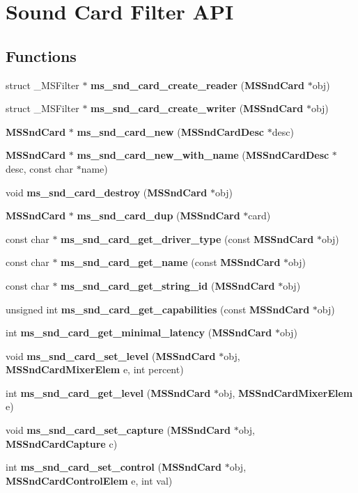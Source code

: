 \section{Sound Card Filter API}
\label{group__mediastreamer2__soundcardfilter}
\subsection*{Functions}
\begin{DoxyCompactItemize}
\item 
struct \_\-MSFilter $\ast$ {\bf ms\_\-snd\_\-card\_\-create\_\-reader} ({\bf MSSndCard} $\ast$obj)
\item 
struct \_\-MSFilter $\ast$ {\bf ms\_\-snd\_\-card\_\-create\_\-writer} ({\bf MSSndCard} $\ast$obj)
\item 
{\bf MSSndCard} $\ast$ {\bf ms\_\-snd\_\-card\_\-new} ({\bf MSSndCardDesc} $\ast$desc)
\item 
{\bf MSSndCard} $\ast$ {\bf ms\_\-snd\_\-card\_\-new\_\-with\_\-name} ({\bf MSSndCardDesc} $\ast$desc, const char $\ast$name)
\item 
void {\bf ms\_\-snd\_\-card\_\-destroy} ({\bf MSSndCard} $\ast$obj)
\item 
{\bf MSSndCard} $\ast$ {\bf ms\_\-snd\_\-card\_\-dup} ({\bf MSSndCard} $\ast$card)
\item 
const char $\ast$ {\bf ms\_\-snd\_\-card\_\-get\_\-driver\_\-type} (const {\bf MSSndCard} $\ast$obj)
\item 
const char $\ast$ {\bf ms\_\-snd\_\-card\_\-get\_\-name} (const {\bf MSSndCard} $\ast$obj)
\item 
const char $\ast$ {\bf ms\_\-snd\_\-card\_\-get\_\-string\_\-id} ({\bf MSSndCard} $\ast$obj)
\item 
unsigned int {\bf ms\_\-snd\_\-card\_\-get\_\-capabilities} (const {\bf MSSndCard} $\ast$obj)
\item 
int {\bf ms\_\-snd\_\-card\_\-get\_\-minimal\_\-latency} ({\bf MSSndCard} $\ast$obj)
\item 
void {\bf ms\_\-snd\_\-card\_\-set\_\-level} ({\bf MSSndCard} $\ast$obj, {\bf MSSndCardMixerElem} e, int percent)
\item 
int {\bf ms\_\-snd\_\-card\_\-get\_\-level} ({\bf MSSndCard} $\ast$obj, {\bf MSSndCardMixerElem} e)
\item 
void {\bf ms\_\-snd\_\-card\_\-set\_\-capture} ({\bf MSSndCard} $\ast$obj, {\bf MSSndCardCapture} c)
\item 
int {\bf ms\_\-snd\_\-card\_\-set\_\-control} ({\bf MSSndCard} $\ast$obj, {\bf MSSndCardControlElem} e, int val)

\end{DoxyCompactItemize}
